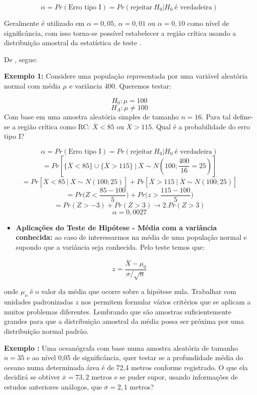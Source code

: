 \documentclass[
]{book}
\providecommand{\tightlist}{%
  \setlength{\itemsep}{0pt}\setlength{\parskip}{0pt}}
\begin{document}
\begin{equation} 
 \alpha=Pr(\mbox{Erro tipo I})=Pr(\mbox{rejeitar} \ H_0|H_0 \ \mbox{é verdadeira})
  \label{eq:nivelsignificancia}
\end{equation}

Geralmente é utilizado em \(\alpha=0,05\), \(\alpha=0,01\) ou \(\alpha=0,10\) como nível de significância, com isso torna-se possível estabelecer a região crítica usando a distribuição amostral da estatística de teste \citep{fariaestatistic}.

De \citet{fariaestatistic}, segue:

\textbf{Exemplo 1:} Considere uma população representada por uma variável aleatória normal com média \(\mu\) e variância 400. Queremos testar:

\[H_0:\mu = 100\]
\[H_A:\mu \neq 100\]
Com base em uma amostra aleatória simples de tamanho \(n=16\). Para tal define-se a região crítica como RC: \(\overline{X}<85\) ou \(\overline{X}>115\). Qual é a probabilidade do erro tipo I?

\[\alpha=Pr(\mbox{Erro tipo I})=Pr(\mbox{rejeitar} \ H_0|H_0 \ \mbox{é verdadeira})\]
\[=Pr[\{\overline{X}<85\} \cup \{\overline{X}>115\} \ | \ \overline{X}\sim N(100;\frac{400}{16}=25)]\]
\[=Pr[\overline{X}<85 \ | \  \overline{X}\sim N(100;25)]+Pr[\overline{X}>115 \ | \ \overline{X}\sim N(100;25)]\]
\[=Pr\bigg( Z<\frac{85-100}{5} \bigg)+Pr\bigg( z>\frac{115-100}{5} \bigg)\]
\[=Pr(Z>-3)+Pr(Z>3) \rightarrow 2.Pr(Z>3)\]
\[\alpha=0,0027\]

\begin{itemize}
\tightlist
\item
  \textbf{Aplicações do Teste de Hipótese - Média com a variância conhecida:} ao caso de interessarmos na média de uma população normal e supondo que a variância seja conhecida. Pelo teste temos que:
\end{itemize}

\begin{equation} 
z=\frac{\overline{X}-\mu_0}{\sigma/\sqrt{n}}
  \label{eq:testehipmedia}
\end{equation}

onde \(\mu_o\) é o valor da média que ocorre sobre a hipótese nula. Trabalhar com unidades padronizadas \(z\) nos permitem formular vários critérios que se aplicam a muitos problemas diferentes. Lembrando que são amostras suficientemente grandes para que a distribuição amostral da média possa ser próxima por uma distribuição normal padrão.

\textbf{Exemplo \citep{freund2009estatistica}:} Uma oceanógrafa com base numa amostra aleatória de tamanho \(n=35\) e ao nível 0,05 de significância, quer testar se a profundidade média do oceano numa determinada área é de 72,4 metros conforme registrado. O que ela decidirá se obtiver \(\overline{x}=73,2\) metros e se puder supor, usando informações de estudos anteriores análogos, que \(\sigma=2,1\) metros?
\end{document}
